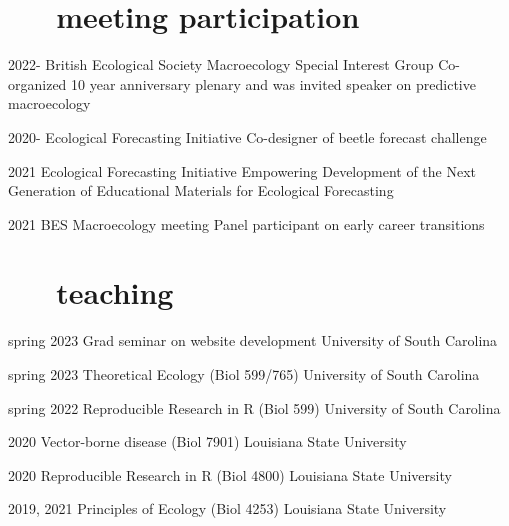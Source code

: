 \documentclass[]{CV}
\begin{document}
\section{\faVideoCamera \ \ \ meeting participation}

\begin{entrylist}

  \entry
    {2022-}
		{British Ecological Society Macroecology Special Interest Group}
    {Co-organized 10 year anniversary plenary and was invited speaker on predictive macroecology}

  \entry
    {2020-}
		{Ecological Forecasting Initiative }
    {Co-designer of beetle forecast challenge}

  \entry
    {2021}
		{Ecological Forecasting Initiative}
    {Empowering Development of the Next Generation of Educational Materials for Ecological Forecasting}

  \entry
    {2021}
		{BES Macroecology meeting}
    {Panel participant on early career transitions}

\end{entrylist}












\section{ \faInstitution \ \ \ teaching}

\begin{entrylist}


  \entry
    {spring 2023}
    {Grad seminar on website development} 
    {University of South Carolina}

  \entry
    {spring 2023}
		{Theoretical Ecology (Biol 599/765)} 
    {University of South Carolina}

  \entry
    {spring 2022}
		{Reproducible Research in R (Biol 599)}
    {University of South Carolina}

  \entry
    {2020}
		{Vector-borne disease (Biol 7901)}
    {Louisiana State University}

  \entry
    {2020}
		{Reproducible Research in R (Biol 4800)}
    {Louisiana State University}

  \entry
    {2019, 2021}
		{Principles of Ecology (Biol 4253)}
    {Louisiana State University}

\end{entrylist}
\end{document}

